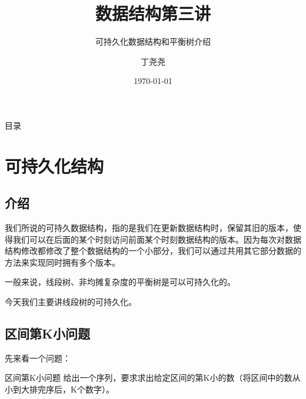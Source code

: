 \documentclass{beamer}
\title{数据结构第三讲}
\subtitle{可持久化数据结构和平衡树介绍}
\author{丁尧尧}
\institute{上海交通大学}
\date{\today}
\begin{document}
	\maketitle
	\begin{frame}{目录}
		\tableofcontents
	\end{frame}
	\section{可持久化结构}
		\subsection{介绍}
		\begin{frame}
			我们所说的可持久数据结构，指的是我们在更新数据结构时，保留其旧的版本，使得我们可以在后面的某个时刻访问前面某个时刻数据结构的版本。因为每次对数据结构修改都修改了整个数据结构的一个小部分，我们可以通过共用其它部分数据的方法来实现同时拥有多个版本。
			
			一般来说，线段树、非均摊复杂度的平衡树是可以可持久化的。
			
			今天我们主要讲线段树的可持久化。
		\end{frame}
		\subsection{区间第K小问题}
		\begin{frame}
			先来看一个问题：
			\begin{block}{区间第K小问题}
				给出一个序列，要求求出给定区间的第K小的数（将区间中的数从小到大排完序后，K个数字）。
			\end{block} 
		\end{frame}
\end{document}
